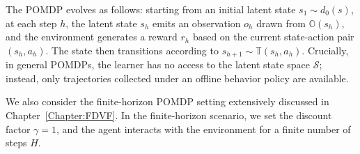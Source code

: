 \documentclass[twoside]{article}
\newcommand{\CAL}[1]{\mathcal{#1}}
\newcommand{\yplu}[1]{{\color{orange}{ [\textbf{Yiping:}} #1]}}
\begin{document}
The POMDP evolves as follows: starting from an initial latent state $s_1\sim d_0(s)$, at each step $h$, the latent state $s_h$ emits an observation $o_h$ drawn from $\mathbb{O}(s_h)$, and the environment generates a reward $r_h$ based on the current state-action pair $(s_h,a_h)$. The state then transitions according to $s_{h+1}\sim\mathbb{T}(s_h,a_h)$. Crucially, in general POMDPs, the learner has no access to the latent state space $\CAL{S}$; instead, only trajectories collected under an offline behavior policy are available.


We also consider the finite-horizon POMDP setting extensively discussed in Chapter~\ref{Chapter:FDVF}. In the finite-horizon scenario, we set the discount factor $\gamma=1$, and the agent interacts with the environment for a finite number of steps $H$. 

\end{document}
